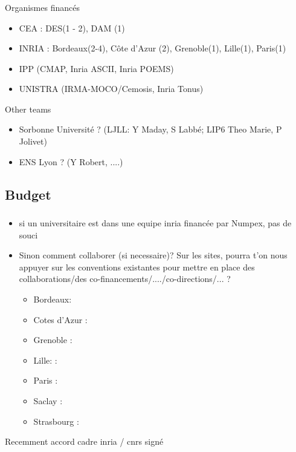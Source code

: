 \begin{frame}
  \frametitle{\insertsectionhead}
  \framesubtitle{\insertsubsectionhead}

  Organismes financés
  \begin{itemize}
    \item CEA : DES(1 - 2), DAM (1)
    \item INRIA : Bordeaux(2-4),  Côte d'Azur (2), Grenoble(1), Lille(1), Paris(1)
    \item IPP (CMAP, Inria ASCII, Inria POEMS)
    \item UNISTRA  (IRMA-MOCO/Cemosis, Inria Tonus)
  \end{itemize}

  \begin{alertblock}{Other teams}
    \begin{itemize}
      \item Sorbonne Université ? (LJLL: Y  Maday, S Labbé; LIP6 Theo Marie, P Jolivet)
      \item ENS Lyon ? (Y Robert, ....) 
    \end{itemize}
  \end{alertblock}
\end{frame}

\subsection{Budget}

\begin{frame}
  \frametitle{\insertsectionhead}
  \framesubtitle{\insertsubsectionhead}
  \begin{itemize}
    \item si un universitaire est dans une equipe inria financée par Numpex, pas de souci
    \item Sinon comment collaborer (si necessaire)? Sur les sites, pourra t'on nous appuyer sur les conventions existantes pour 
    mettre en place des collaborations/des co-financements/..../co-directions/... ?
    \begin{itemize}
      \item Bordeaux: 
      \item Cotes d'Azur : 
      \item Grenoble : 
      \item Lille:  : 
      \item Paris : 
      \item Saclay : 
      \item Strasbourg : 
    \end{itemize}
  \end{itemize}
  \alert{Recemment accord cadre inria / cnrs signé}

\end{frame}

